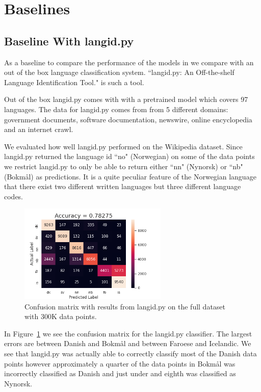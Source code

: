 \section{Baselines}

\subsection{Baseline With langid.py}

As a baseline to compare the performance of the models in we compare with an out of the box language classification system. ``langid.py: An Off-the-shelf Language Identification Tool." \cite{langID} is such a tool.

Out of the box langid.py comes with with a pretrained model which covers 97 languages. The data for langid.py comes from from 5 different domains: government documents, software documentation, newswire, online encyclopedia and an internet crawl.

We evaluated how well langid.py performed on the Wikipedia dataset. Since langid.py returned the language id ``no" (Norwegian) on some of the data points we restrict langid.py to only be able to return either ``nn" (Nynorsk) or ``nb" (Bokmål) as predictions. It is a quite peculiar feature of the Norwegian language that there exist two different written languages but three different language codes.

\begin{figure}[h!]
  \centering
  \includegraphics[width = 200pt]{figs/langid}
  \caption{Confusion matrix with results from langid.py on the full dataset with 300K data points. }
  \label{langid_confusion_matrix}
\end{figure}

In Figure~\ref{langid_confusion_matrix} we see the confusion matrix for the langid.py classifier. The largest errors are between Danish and Bokmål and between Faroese and Icelandic. We see that langid.py was actually able to correctly classify most of the Danish data points however approximately a quarter of the data points in Bokmål was incorrectly classified as Danish and just under and eighth was classified as Nynorsk.

